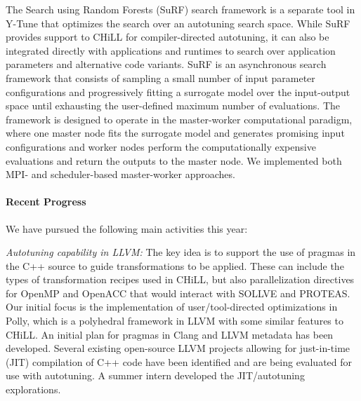 The Search using Random Forests (SuRF) search framework is a separate tool in Y-Tune that optimizes the search over an autotuning search space.  While
SuRF provides support to CHiLL for compiler-directed autotuning, it can
also be integrated directly with applications and runtimes to search over
application parameters and alternative code variants.
SuRF is an asynchronous search framework that consists of sampling a small number of input parameter configurations and progressively fitting a surrogate model over the input-output space until exhausting the user-defined maximum number of evaluations. The framework is designed to operate in the master-worker computational paradigm, where one master node fits the surrogate model and generates promising input configurations and worker nodes perform the computationally expensive evaluations and return the outputs to the master node. We implemented both MPI- and scheduler-based master-worker approaches.


\paragraph{Recent Progress}


We have pursued the following main activities this year:

\textit{Autotuning capability in LLVM:}
The key idea is to support the use of pragmas in the C++ source to guide transformations to be applied. These can include the types of transformation recipes used in CHiLL, but also parallelization directives for OpenMP and OpenACC that would interact with SOLLVE and PROTEAS. Our initial focus is the implementation of user/tool-directed optimizations in Polly, which is a polyhedral framework in LLVM with some similar features to CHiLL. An initial plan for pragmas in Clang and LLVM metadata has been developed. Several existing open-source LLVM projects allowing for just-in-time (JIT) compilation of C++ code have been identified and are being evaluated for use with autotuning. A summer intern developed the JIT/autotuning explorations. 

